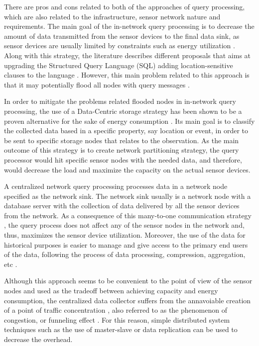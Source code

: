 There are pros and cons related to both of the approaches of query processing,
which are also related to the infrastructure, sensor network nature and 
requirements. The main goal of the in-network query processing is to decrease
the amount of data transmitted from the sensor devices to the final data sink, as
sensor devices are usually limited by constraints such as energy utilization 
\cite{sn-storage03}. Along with this strategy, the literature describes
different proposals that aims at upgrading the Structured Query Language (SQL)
adding location-sensitive clauses to the language \cite{sn-db-newop01}
\cite{sn-db-newop02}. However, this main problem related to this approach is
that it may potentially flood all nodes with query messages \cite{sn-storage04}.

In order to mitigate the problems related flooded nodes in in-network query
processing, the use of a Data-Centric storage strategy has been shown to be a
proven alternative for the sake of energy consumption \cite{sn-storage03}
\cite{sn-storage01}. Its main goal is to classify the collected data based in a
specific property, say location or event, in order to be sent to specific
storage nodes that relates to the observation. As the main outcome of this
strategy is to create network partitioning strategy, the query processor would
hit specific sensor nodes with the needed data, and therefore, would
decrease the load and maximize the capacity on the actual sensor devices.

A centralized network query processing processes data in a network node
specified as the network sink. The network sink usually is a network
node with a database server with the collection of data delivered by
all the sensor devices from the network. As a consequence of this
many-to-one communication strategy \cite{sn-storage02}, the query process does
not affect any of the sensor nodes in the network and, thus, maximizes the
sensor device utilization. Moreover, the use of the data for historical
purposes is easier to manage and give access to the primary end users of the
data, following the process of data processing, compression, aggregation, etc
\cite{sn-db02}.

Although this approach seems to be convenient to the point of view of the
sensor nodes and used as the tradeoff between achieving capacity and energy
consumption, the centralized data collector suffers from the annavoiable
creation of a point of traffic concentration \cite{sn-storage02}, also referred
to as the phenomenon of congestion, or funneling effect \cite{sn-storage04}.
For this reason, simple distributed system techniques such as the use of
master-slave or data replication can be used to decrease the overhead.

